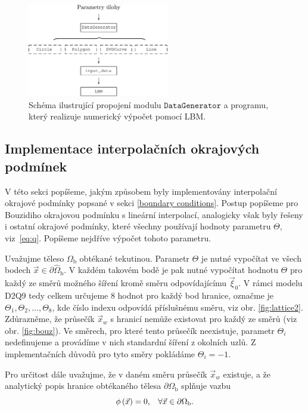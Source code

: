 \begin{figure}[h]
	\centering
	\vspace{4mm}
	\includegraphics[width=0.55\textwidth]{Images/schemakodu.pdf}
	\caption{Schéma ilustrující propojení modulu $\mathtt{DataGenerator} $ a programu, který realizuje numerický výpočet pomocí LBM.}
	\vspace{2.5mm}
	\label{fig:schemakodu}
\end{figure}

\subsection{Implementace interpolačních okrajových podmínek}\label{implementace interpolace}
V této sekci popíšeme, jakým způsobem byly implementovány interpolační okrajové podmínky popsané v sekci \ref{boundary conditions}. Postup popíšeme pro Bouzidiho okrajovou podmínku s lineární interpolací, analogicky však byly řešeny i ostatní okrajové podmínky, které všechny používají hodnoty parametru $ \Theta $, viz~\eqref{eq:q}. Popíšeme nejdříve výpočet tohoto parametru.

Uvažujme těleso $ {\Omega}_{\mathrm{b}} $ obtékané tekutinou. Parametr $ \Theta $ je nutné vypočítat ve všech bodech $ \vec{x} \in \partial \hat{\Omega}_{\mathrm{b}} $. V každém takovém bodě je pak nutné vypočítat hodnotu $ \Theta $ pro každý ze směrů možného šíření kromě směru odpovídajícímu $ \vec{\xi}_0 $. V rámci modelu D2Q9 tedy celkem určujeme 8 hodnot pro každý bod hranice, označme je $ \Theta_1, \Theta_2, \dots, \Theta_8$, kde číslo indexu odpovídá příslušnému směru, viz obr. \ref{fig:lattice2}. Zdůrazněme, že průsečík $ \vec{x}_w $ s hranicí nemůže existovat pro každý ze směrů (viz obr. \ref{fig:bouz}). Ve směrech, pro které tento průsečík neexistuje, parametr $ \Theta _i $ nedefinujeme a provádíme v nich standardní šíření z okolních uzlů. Z implementačních důvodů pro tyto směry pokládáme  $ \Theta_i = -1$.

Pro určitost dále uvažujme, že v daném směru průsečík $ \vec{x}_w $ existuje, a že analytický popis hranice obtékaného tělesa $ \partial {\Omega}_{\mathrm{b}} $ splňuje vazbu
\begin{equation}\label{eq:kruznice}
	\phi \, (\vec{x}) = 0, \hspace{3mm} \forall \vec{x} \in \partial {\Omega}_{\mathrm{b}}.
\end{equation}

